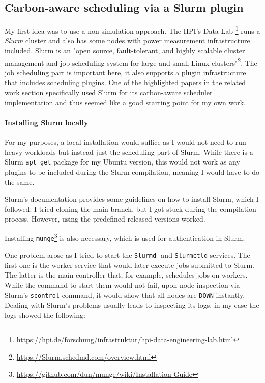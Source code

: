 \subsection{Carbon-aware scheduling via a Slurm plugin}
\label{subsec:slurm_plugin}

My first idea was to use a non-simulation approach. 
The HPI's Data Lab \footnote{\url{https://hpi.de/forschung/infrastruktur/hpi-data-engineering-lab.html}} runs a \emph{Slurm} cluster and also has some nodes with power measurement infrastructure included. 
Slurm is an "open source, fault-tolerant, and highly scalable cluster management and job scheduling system for large and small Linux clusters"\footnote{\url{https://Slurm.schedmd.com/overview.html}}. 
The job scheduling part is important here, it also supports a plugin infrastructure that includes scheduling plugins. 
One of the highlighted papers\cite{inigo_goiri_greenslot_2011} in the related work section specifically used Slurm for its carbon-aware scheduler implementation and thus seemed like a good starting point for my own work.

\paragraph{Installing Slurm locally}

For my purposes, a local installation would suffice as I would not need to run heavy workloads but instead just the scheduling part of Slurm. 
While there is a Slurm \verb|apt get| package for my Ubuntu version, this would not work as any plugins to be included during the Slurm compilation, meaning I would have to do the same.

Slurm's documentation provides some guidelines on how to install Slurm, which I followed. 
I tried cloning the main branch, but I got stuck during the compilation process. However, using the predefined released versions worked.

Installing \verb|munge|\footnote{\url{https://github.com/dun/munge/wiki/Installation-Guide}} is also necessary, which is used for authentication in Slurm.

One problem arose as I tried to start the \verb|Slurmd|- and \verb|Slurmctld| services. The first one is the worker service that would later execute jobs submitted to Slurm. The latter is the main controller that, for example, schedules jobs on workers. While the command to start them would not fail, upon node inspection via Slurm's \verb|scontrol| command, it would show that all nodes are \verb|DOWN| instantly.
|
Dealing with Slurm's problems usually leads to inspecting its logs, in my case the logs showed the following:

